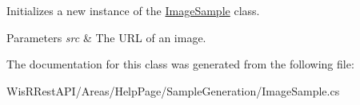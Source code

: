 Initializes a new instance of the \hyperlink{class_wis_r_rest_a_p_i_1_1_areas_1_1_help_page_1_1_image_sample}{Image\+Sample} class. 


\begin{DoxyParams}{Parameters}
{\em src} & The U\+R\+L of an image.\\
\hline
\end{DoxyParams}


The documentation for this class was generated from the following file\+:\begin{DoxyCompactItemize}
\item 
Wis\+R\+Rest\+A\+P\+I/\+Areas/\+Help\+Page/\+Sample\+Generation/Image\+Sample.\+cs\end{DoxyCompactItemize}
